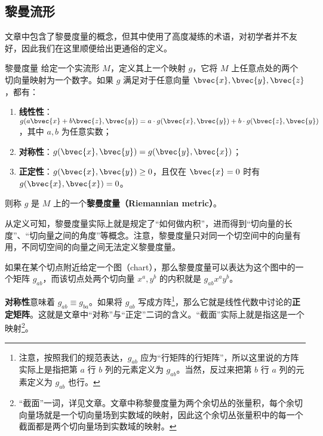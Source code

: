 



\subsection{黎曼流形}\label{sub_RieCon_1}

文章中包含了黎曼度量的概念，但其中使用了高度凝练的术语，对初学者并不友好，因此我们在这里顺便给出更通俗的定义。

\begin{definition}{黎曼度量}
给定一个实流形 $M$，定义其上一个映射 $g$，它将 $M$ 上任意点处的两个切向量映射为一个数字。如果 $g$ 满足对于任意向量 $\bvec{x}, \bvec{y}, \bvec{z}$，都有：
\begin{enumerate}
\item \textbf{线性性}：$g(a\bvec{x}+b\bvec{z}, \bvec{y})=a\cdot g(\bvec{x}, \bvec{y})+b\cdot g(\bvec{z}, \bvec{y})$，其中 $a, b$ 为任意实数；
\item \textbf{对称性}：$g(\bvec{x}, \bvec{y})=g(\bvec{y}, \bvec{x})$；
\item \textbf{正定性}：$g(\bvec{x}, \bvec{y})\geq 0$，且仅在 $\bvec{x}=0$ 时有 $g(\bvec{x}, \bvec{x})=0$。
\end{enumerate}
则称 $g$ 是 $M$ 上的一个\textbf{黎曼度量（Riemannian metric）}。
\end{definition}

从定义可知，黎曼度量实际上就是规定了“如何做内积”，进而得到“切向量的长度”、“切向量之间的角度”等概念。注意，黎曼度量只对同一个切空间中的向量有用，不同切空间的向量之间无法定义黎曼度量。

如果在某个切点附近给定一个图（chart），那么黎曼度量可以表达为这个图中的一个矩阵 $g_{ab}$，而该切点处两个切向量 ${x}^a, {y}^b$ 的内积就是 $g_{ab}{x}^a{y}^b$。

\textbf{对称性}意味着 $g_{ab}\equiv g_{ba}$。如果将 $g_{ab}$ 写成方阵\footnote{注意，按照我们的规范表达，$g_{ab}$ 应为“行矩阵的行矩阵”，所以这里说的方阵实际上是指把第 $a$ 行 $b$ 列的元素定义为 $g_{ab}$。当然，反过来把第 $b$ 行 $a$ 列的元素定义为 $g_{ab}$ 也行。}，那么它就是线性代数中讨论的\textbf{正定矩阵}。这就是文章中“对称”与“正定”二词的含义。“截面”实际上就是指这是一个映射\footnote{“截面”一词，详见文章。文章中称黎曼度量为两个余切丛的张量积，每个余切向量场就是一个切向量场到实数域的映射，因此这个余切丛张量积中的每一个截面都是两个切向量场到实数域的映射。}。


